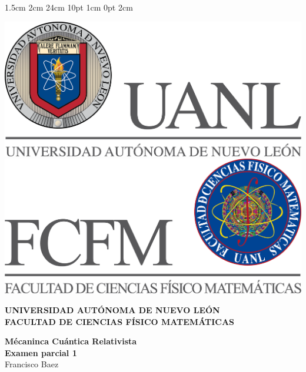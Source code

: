 \documentclass[12pt,letterpaper]{report}
\begin{document}
\setmargins{2.5cm}      
{1.5cm}                     
{2cm}  
{24cm}                    
{10pt}                          
{1cm}                          
{0pt}                             
{2cm}
\begin{titlepage}
\begin{center}
\includegraphics[scale=0.40]{../../Logos/uanl.png} 
\hspace{2.5cm}
\includegraphics[scale=0.40]{../../Logos/fcfm.png}
\end{center}
\vspace{2cm}
\begin{center}
\textbf{
UNIVERSIDAD AUTÓNOMA DE NUEVO LEÓN\\
FACULTAD DE CIENCIAS
    FÍSICO MATEMÁTICAS}\\
\vspace*{2cm}
\begin{large}
\vspace{1cm}
\large{\textbf{Mécaninca Cuántica Relativista}}\\
\textbf{Examen parcial 1}\\
Francisco Baez\\
\end{large}
\end{center}
\vspace{3.5cm}
\begin{center}
\begin{minipage}{0.6\linewidth}

\end{minipage}
\end{center}
\end{titlepage}
\end{document}
